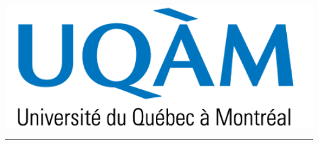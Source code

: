 \documentclass[a0,landscape]{a0poster}
\begin{document}
\begin{minipage}[b]{\linewidth}
\begin{minipage}[c]{0.2\linewidth}
  \center
  \includegraphics[width=15cm]{logo_uqam.png} %
\end{minipage}
\rule{\linewidth}{3pt}
\end{minipage}
%

\vspace{0.5cm} %

\end{document}
